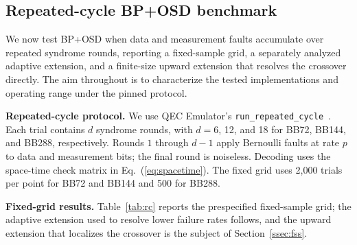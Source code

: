 \documentclass[pdflatex,sn-mathphys-num]{sn-jnl}
\theoremstyle{thmstyleone}
\theoremstyle{thmstyletwo}
\theoremstyle{thmstylethree}
\begin{document}
\subsection{Repeated-cycle BP+OSD benchmark}
\label{sec:rc}

We now test BP+OSD when data and measurement faults accumulate over repeated syndrome rounds, reporting a fixed-sample grid, a separately analyzed adaptive extension, and a finite-size upward extension that resolves the crossover directly. The aim throughout is to characterize the tested implementations and operating range under the pinned protocol.

\noindent\textbf{Repeated-cycle protocol.} We use QEC Emulator's \texttt{run\_repeated\_cycle}~\cite{AlDaajeh2026emulator}. Each trial contains $d$ syndrome rounds, with $d=6$, 12, and 18 for BB72, BB144, and BB288, respectively. Rounds $1$ through $d-1$ apply Bernoulli faults at rate $p$ to data and measurement bits; the final round is noiseless. Decoding uses the space-time check matrix in Eq.~(\ref{eq:spacetime}). The fixed grid uses 2{,}000 trials per point for BB72 and BB144 and 500 for BB288.

\noindent\textbf{Fixed-grid results.} Table~\ref{tab:rc} reports the prespecified fixed-sample grid; the adaptive extension used to resolve lower failure rates follows, and the upward extension that localizes the crossover is the subject of Section~\ref{ssec:fss}.
\end{document}
